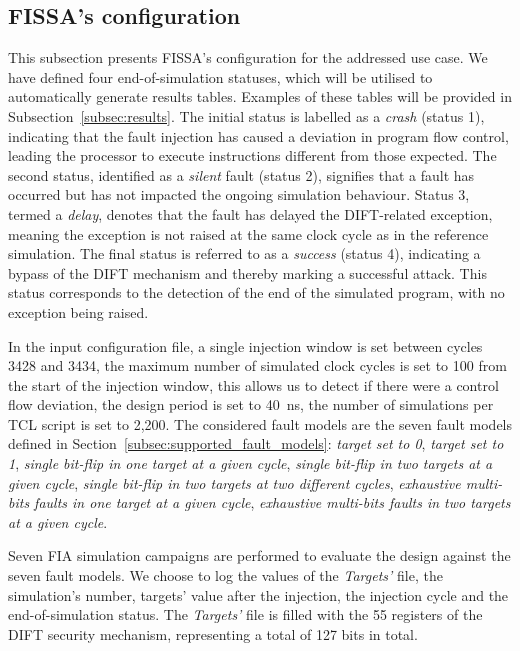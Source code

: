 
\subsection{FISSA's configuration}
\label{subsec:tool_config}

This subsection presents FISSA's configuration for the addressed use case. We have defined four end-of-simulation statuses, which will be utilised to automatically generate results tables. Examples of these tables will be provided in Subsection~\ref{subsec:results}.
The initial status is labelled as a \textit{crash} (status 1), indicating that the fault injection has caused a deviation in program flow control, leading the processor to execute instructions different from those expected.
The second status, identified as a \textit{silent} fault (status 2), signifies that a fault has occurred but has not impacted the ongoing simulation behaviour.
Status 3, termed a \textit{delay}, denotes that the fault has delayed the DIFT-related exception, meaning the exception is not raised at the same clock cycle as in the reference simulation.
The final status is referred to as a \textit{success} (status 4), indicating a bypass of the DIFT mechanism and thereby marking a successful attack. This status corresponds to the detection of the end of the simulated program, with no exception being raised.


In the input configuration file, a single injection window is set between cycles 3428 and 3434, the maximum number of simulated clock cycles is set to 100 from the start of the injection window, this allows us to detect if there were a control flow deviation, the design period is set to 40~ns, the number of simulations per TCL script is set to 2,200. The considered fault models are the seven fault models defined in Section~\ref{subsec:supported_fault_models}: \textit{target set to 0}, \textit{target set to 1}, \textit{single bit-flip in one target at a given cycle}, \textit{single bit-flip in two targets at a given cycle}, \textit{single bit-flip in two targets at two different cycles}, \textit{exhaustive multi-bits faults in one target at a given cycle}, \textit{exhaustive multi-bits faults in two targets at a given cycle}.

Seven FIA simulation campaigns are performed to evaluate the design against the seven fault models.
We choose to log the values of the \textit{Targets'} file, the simulation's number, targets' value after the injection, the injection cycle and the end-of-simulation status.
The \textit{Targets'} file is filled with the 55 registers of the DIFT security mechanism, representing a total of 127 bits in total.


